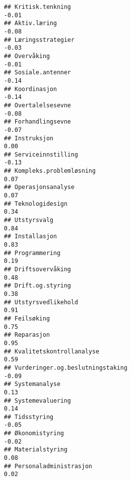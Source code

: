 \documentclass[
]{article}
\begin{document}
\begin{verbatim}
## Kritisk.tenkning                                                                 -0.01
## Aktiv.læring                                                                     -0.08
## Læringsstrategier                                                                -0.03
## Overvåking                                                                       -0.01
## Sosiale.antenner                                                                 -0.14
## Koordinasjon                                                                     -0.14
## Overtalelsesevne                                                                 -0.08
## Forhandlingsevne                                                                 -0.07
## Instruksjon                                                                       0.00
## Serviceinnstilling                                                               -0.13
## Kompleks.problemløsning                                                           0.07
## Operasjonsanalyse                                                                 0.07
## Teknologidesign                                                                   0.34
## Utstyrsvalg                                                                       0.84
## Installasjon                                                                      0.83
## Programmering                                                                     0.19
## Driftsovervåking                                                                  0.48
## Drift.og.styring                                                                  0.38
## Utstyrsvedlikehold                                                                0.91
## Feilsøking                                                                        0.75
## Reparasjon                                                                        0.95
## Kvalitetskontrollanalyse                                                          0.59
## Vurderinger.og.beslutningstaking                                                 -0.09
## Systemanalyse                                                                     0.13
## Systemevaluering                                                                  0.14
## Tidsstyring                                                                      -0.05
## Økonomistyring                                                                   -0.02
## Materialstyring                                                                   0.08
## Personaladministrasjon                                                            0.02

\end{verbatim}
\end{document}
